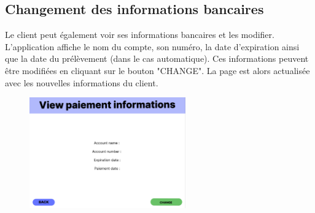 \subsection{Changement des informations bancaires}
\begin{flushleft}
Le client peut également voir ses informations bancaires et les modifier. L'application affiche le nom du compte, son numéro, la date d'expiration ainsi que la date du prélèvement (dans le cas automatique). Ces informations peuvent être modifiées en cliquant sur le bouton "CHANGE". La page est alors actualisée avec les nouvelles informations du client.
\end{flushleft}
\begin{figure}[h]
\centering
\includegraphics[width = 0.6\textwidth]{extension-maxime/interface/img/paiement-informations.png}
\end{figure}

